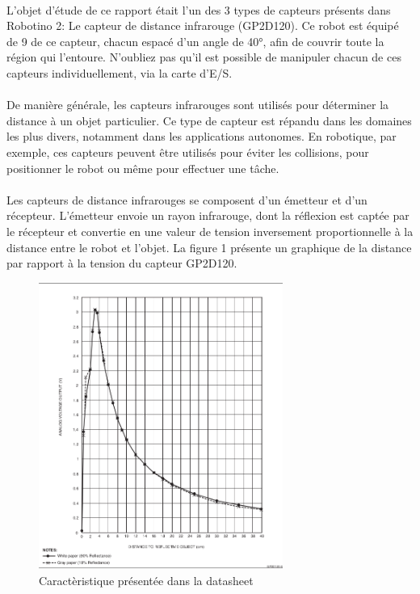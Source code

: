 \documentclass[oneside,a4paper,12pt]{article}
\begin{document}
	\paragraph{}
	L'objet d'étude de ce rapport était l'un des 3 types de capteurs présents dans Robotino 2: Le capteur de distance infrarouge (GP2D120). Ce robot est équipé de 9 de ce capteur, chacun espacé d'un angle de 40°, afin de couvrir toute la région qui l'entoure. N'oubliez pas qu'il est possible de manipuler chacun de ces capteurs individuellement, via la carte d'E/S.
	\paragraph{}
	De manière générale, les capteurs infrarouges sont utilisés pour déterminer la distance à un objet particulier. Ce type de capteur est répandu dans les domaines les plus divers, notamment dans les applications autonomes. En robotique, par exemple, ces capteurs peuvent être utilisés pour éviter les collisions, pour positionner le robot ou même pour effectuer une tâche.
	\paragraph{}
	Les capteurs de distance infrarouges se composent d'un émetteur et d'un récepteur. L'émetteur envoie un rayon infrarouge, dont la réflexion est captée par le récepteur et convertie en une valeur de tension inversement proportionnelle à la distance entre le robot et l'objet. La figure 1 présente un graphique de la distance par rapport à la tension du capteur GP2D120.
	\begin{figure}[h]
		\centering
		\includegraphics[width=8cm]{screenDatasheet.png}
		\caption{Caractèristique présentée dans la datasheet}
	\end{figure} 
\end{document}
